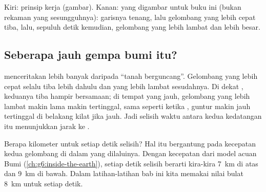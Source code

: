 \begin{omfigure}
{\small Kiri: prinsip kerja  (gambar). Kanan:  yang
digambar untuk buku ini (bukan rekaman yang sesungguhnya): garisnya
tenang, lalu gelombang yang lebih cepat tiba, lalu, sepuluh detik kemudian,
gelombang yang lebih lambat dan lebih besar.}
\label{fig:g7:earthquakes:seismometer}
\end{omfigure}

\subsection*{Seberapa jauh gempa bumi itu?}

 menceritakan lebih banyak daripada ``tanah berguncang''.
Gelombang yang lebih cepat selalu tiba lebih dahulu dan yang lebih lambat
sesudahnya. Di dekat , keduanya tiba hampir bersamaan; di tempat
yang jauh, gelombang yang lebih lambat makin lama makin tertinggal, sama
seperti ketika , guntur makin jauh tertinggal di belakang kilat jika
 jauh. Jadi selisih waktu antara kedua kedatangan itu menunjukkan
jarak ke .

Berapa kilometer untuk setiap detik selisih? Hal itu bergantung pada
kecepatan kedua gelombang di dalam  yang dilaluinya. Dengan kecepatan
dari model acuan Bumi (\cref{ch:g6:inside-the-earth}), setiap detik selisih
berarti kira-kira \qty{7}{km} di  atas dan \qty{9}{km} di  bawah.
Dalam latihan-latihan bab ini kita memakai nilai bulat \qty{8}{km} untuk
setiap detik.

